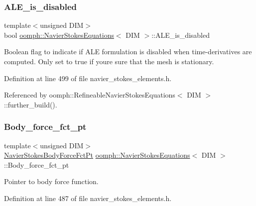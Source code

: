 \subsubsection{\texorpdfstring{A\+L\+E\+\_\+is\+\_\+disabled}{ALE\_is\_disabled}}
{\footnotesize\ttfamily template$<$unsigned D\+IM$>$ \\
bool \hyperlink{classoomph_1_1NavierStokesEquations}{oomph\+::\+Navier\+Stokes\+Equations}$<$ D\+IM $>$\+::A\+L\+E\+\_\+is\+\_\+disabled\hspace{0.3cm}{\ttfamily [protected]}}



Boolean flag to indicate if A\+LE formulation is disabled when time-\/derivatives are computed. Only set to true if you\textquotesingle{}re sure that the mesh is stationary. 



Definition at line 499 of file navier\+\_\+stokes\+\_\+elements.\+h.



Referenced by oomph\+::\+Refineable\+Navier\+Stokes\+Equations$<$ D\+I\+M $>$\+::further\+\_\+build().

\mbox{\label{classoomph_1_1NavierStokesEquations_adf299ef64652fd7ee9491574feee8a38}} 
\subsubsection{\texorpdfstring{Body\+\_\+force\+\_\+fct\+\_\+pt}{Body\_force\_fct\_pt}}
{\footnotesize\ttfamily template$<$unsigned D\+IM$>$ \\
\hyperlink{classoomph_1_1NavierStokesEquations_a01443cdc37d9aa9d7644c79212108842}{Navier\+Stokes\+Body\+Force\+Fct\+Pt} \hyperlink{classoomph_1_1NavierStokesEquations}{oomph\+::\+Navier\+Stokes\+Equations}$<$ D\+IM $>$\+::Body\+\_\+force\+\_\+fct\+\_\+pt\hspace{0.3cm}{\ttfamily [protected]}}



Pointer to body force function. 



Definition at line 487 of file navier\+\_\+stokes\+\_\+elements.\+h.

